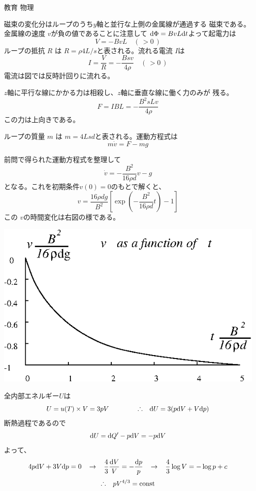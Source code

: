 \documentclass[fleqn]{jbook}
\begin{document}
\begin{answer}{教育 物理}{}
\begin{subanswers}
\begin{subsubanswers}
    磁束の変化分はループのうち$y$軸と並行な上側の金属線が通過する
    磁束である。金属線の速度 $v$が負の値であることに注意して
    ${\rm d}\Phi = B v L {\rm d}t$よって起電力は
%
    \[ V = -BvL \quad (\,>0\,) \]
%
    ループの抵抗 $R$ は $R=\rho 4L/s$と表される。流れる電流 $I$は
%
    \[ I = \frac{V}{R} = -\frac{Bsv}{4\rho} \quad (\,>0\,) \]
%
    電流は図では反時計回りに流れる。

  \SubSubAnswer
    $z$軸に平行な線にかかる力は相殺し、$z$軸に垂直な線に働く力のみが
    残る。
%
    \[ F = IBL = -\frac{B^{2}sLv}{4\rho} \]
%
    この力は上向きである。

  \SubSubAnswer
    ループの質量 $m$ は $m=4Lsd$と表される。運動方程式は
%
    \[ m\dot{v} = F - mg \]

  \SubSubAnswer
    \parbox[t]{75mm}{
    前問で得られた運動方程式を整理して
%
    \[ \dot{v} = -\frac{B^2}{16\rho d}v - g \]
%
    となる。これを初期条件$v(0)=0$のもとで解くと、
%
    \[ v = \frac{16\rho dg}{B^{2}} \left[%
             \exp{\left( -\frac{B^2}{16\rho d}t\right)} - 1%
           \right] \]
%
    この $v$の時間変化は右図の様である。
%
    }\parbox[t]{75mm}{\vspace*{-10mm}
    \begin{center}
      \mbox{\includegraphics[clip]{1993phys-3.eps}}
    \end{center}}

  \end{subsubanswers}


\SubAnswer
  \begin{subsubanswers}
  \SubSubAnswer
    全内部エネルギー$U$は
%
    \[ U=u(T) \times V = 3pV  \hspace{15mm}%
       \Yueni \d{U}=3(p\d{V}+V\d{p}) \]
%
    断熱過程であるので
%
    \[ {\rm d}U={\rm d}Q'-p{\rm d}V=-p{\rm d}V \]
%
    よって、
%
    \[ 4p\d{V}+3V\d{p}=0%
       \hspace{3mm} \rightarrow \hspace{3mm}%
       \frac{4}{3}\frac{\d{V}}{V}=-\frac{\d{p}}{p}%
       \hspace{3mm} \rightarrow \hspace{3mm}%
       \frac{4}{3}\log{V}=-\log{p}+c \]
    \[ \Yueni pV^{4/3}= {\rm const} \] 


\end{subsubanswers}
\end{subanswers}
\end{answer}
\end{document}
